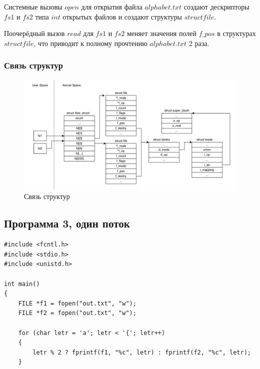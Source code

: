 Системные вызовы $open$ для открытия файла $alphabet.txt$ создают дескрипторы $fs1$ и $fs2$  типа $int$ открытых файлов и создают структуры $struct file$.

Поочерёдный вызов $read$ для  $fs1$ и $fs2$ меняет значения полей $f\_pos$ в структурах $struct file$, что приводит к полному прочтению $alphabet.txt$ 2 раза.


\clearpage

\subsubsection*{Связь структур}

\begin{figure}[h]
	\centering
	\captionsetup{justification=centering}
	\includegraphics[width=160mm]{img/prog2_diagram.png}
	\caption{Связь структур}
	\label{fig:prog-2-diagram}
\end{figure}

\subsection*{Программа 3, один поток}

\begin{center}
	\captionsetup{justification=raggedright,singlelinecheck=off}

	\begin{lstlisting}[label=lst:prog3-1,caption=Программа 3 --- один поток --- часть 1]
#include <fcntl.h>
#include <stdio.h>
#include <unistd.h>

int main() 
{
    FILE *f1 = fopen("out.txt", "w");
    FILE *f2 = fopen("out.txt", "w");

    for (char letr = 'a'; letr < '{'; letr++) 
    {
        letr % 2 ? fprintf(f1, "%c", letr) : fprintf(f2, "%c", letr);
    }
	\end{lstlisting}
\end{center}

